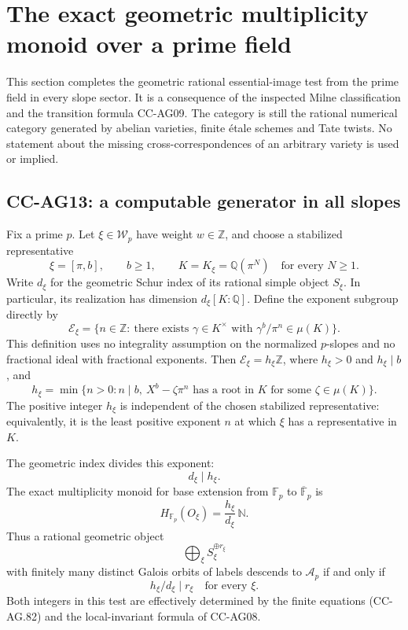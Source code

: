 \section{The exact geometric multiplicity monoid over a prime field}

This section completes the geometric rational essential-image test
from the prime field in every slope sector.  It is a consequence of
the inspected Milne classification and the transition formula
CC-AG09.  The category is still the rational numerical category
generated by abelian varieties, finite étale schemes and Tate
twists.  No statement about the missing cross-correspondences of
an arbitrary variety is used or implied.

\subsection{CC-AG13: a computable generator in all slopes}

Fix a prime \(p\).  Let \(\xi\in\mathcal W_p\) have weight
\(w\in\mathbb Z\), and choose a stabilized representative
\[
 \xi=[\pi,b],\qquad b\ge1,\qquad
 K=K_\xi=\mathbb Q(\pi^N)\quad\text{for every }N\ge1.
                                                        \tag{CC-AG.80}
\]
Write \(d_\xi\) for the geometric Schur index of its rational
simple object \(S_\xi\).  In particular, its realization has
dimension \(d_\xi[K:\mathbb Q]\).
Define the exponent subgroup directly by
\[
 \mathscr E_\xi=
 \{n\in\mathbb Z:\ \text{there exists }\gamma\in K^\times
                    \text{ with }\gamma^b/\pi^n\in\mu(K)\}.
                                                        \tag{CC-AG.81}
\]
This definition uses no integrality assumption on the normalized
\(p\)-slopes and no fractional ideal with fractional exponents.
Then \(\mathscr E_\xi=h_\xi\mathbb Z\), where \(h_\xi>0\) and
\(h_\xi\mid b\), and
\[
 h_\xi=\min\{n>0:n\mid b,\ 
            X^b-\zeta\pi^n\text{ has a root in }K
                          \text{ for some }\zeta\in\mu(K)\}.
                                                        \tag{CC-AG.82}
\]
The positive integer \(h_\xi\) is independent of the chosen
stabilized representative: equivalently, it is the least positive
exponent \(n\) at which \(\xi\) has a representative in \(K\).

The geometric index divides this exponent:
\[
                              d_\xi\mid h_\xi.
                                                        \tag{CC-AG.83}
\]
The exact multiplicity monoid for base extension from
\(\mathbb F_p\) to \(\overline{\mathbb F}_p\) is
\[
                 H_{\mathbb F_p}(O_\xi)
                      =\frac{h_\xi}{d_\xi}\,\mathbb N.
                                                        \tag{CC-AG.84}
\]
Thus a rational geometric object
\[
                         \bigoplus_\xi S_\xi^{\oplus r_\xi}
\]
with finitely many distinct Galois orbits of labels descends
to \(\mathcal A_p\) if and only if
\[
                        h_\xi/d_\xi\mid r_\xi
                            \quad\text{for every }\xi.
                                                        \tag{CC-AG.85}
\]
Both integers in this test are effectively determined by the
finite equations (CC-AG.82) and the local-invariant formula
of CC-AG08.

